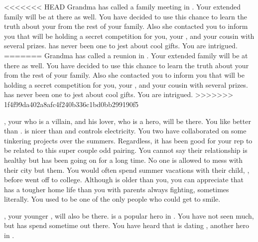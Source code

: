 \documentclass[char]{LRSguildcamp1}
\begin{document}
<<<<<<< HEAD
Grandma has called a family meeting in \pCityGrandma{}. Your extended family will be at there as well. You have decided to use this chance to learn the truth about your \cAS{\parent} from the rest of your family. Also she contacted you to inform you that \cGrandma{\they} will be holding a secret competition for you, your \cTween{\sibling}, and your cousin with several prizes. \cGrandma{} has never been one to jest about cool gifts. You are intrigued. 
=======
Grandma has called a reunion in \pCityGrandma{}. Your extended family will be at there as well. You have decided to use this chance to learn the truth about your \cAS{\parent} from the rest of your family. Also she contacted you to inform you that \cGrandma{\they} will be holding a secret competition for you, your \cTween{\sibling}, and your cousin with several prizes. \cGrandma{} has never been one to jest about cool gifts. You are intrigued.  
>>>>>>> 1f4f99da402a8afc4f240b336c1bd0bb299190f5

\cOldest{}, your \cOldest{\uncle} who is a villain, and his lover, \cOS{} who is a hero, will be there. You like \cOS{} better than \cOldest{}. \cOS{\They} is nicer than \cOldest{} and controls electricity. You two have collaborated on some tinkering projects over the summers. Regardless, it has been good for your rep to be related to this super couple odd pairing. You cannot say their relationship is healthy but has been going on for a long time. No one is allowed to mess with their city but them.  You would often spend summer vacations with their child, \cGrad{}, before \cGrad{\they} went off to college. Although \cGrad{} is older than you, you can appreciate that \cGrad{} has a tougher home life than you with parents always fighting, sometimes literally. You used to be one of the only people who could get \cGrad{} to smile.

\cYoungest{}, your younger \cYoungest{\uncle}, will also be there. \cYoungest{\They} is a popular hero in \pCityYoungest{}. You have not seen \cYoungest{\them} much, but \cTween{} has spend sometime out there. You have heard that \cYoungest{} is dating \cYS{}, another hero in \pCityYoungest{}.
\end{document}
